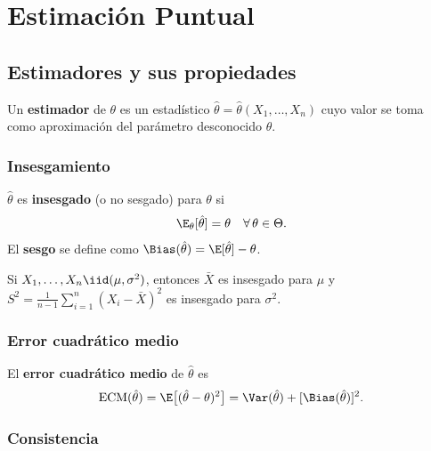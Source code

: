 \section{Estimación Puntual}

\subsection{Estimadores y sus propiedades}

\begin{defi}[Estimador]
  Un \textbf{estimador} de $\theta$ es un estadístico $\hat{\theta} =
  \hat{\theta}(X_1,\ldots,X_n)$ cuyo valor se toma como aproximación del
  parámetro desconocido $\theta$.
\end{defi}

\subsubsection{Insesgamiento}

\begin{defi}
  $\hat{\theta}$ es \textbf{insesgado} (o no sesgado) para $\theta$ si
  \[
    \E_\theta[\hat{\theta}] = \theta \quad \forall\, \theta \in \Theta.
  \]
  El \textbf{sesgo} se define como $\Bias(\hat{\theta}) = \E[\hat{\theta}] - \theta$.
\end{defi}

\begin{ejemplo}
  Si $X_1,\ldots,X_n \iid (\mu, \sigma^2)$, entonces $\bar{X}$ es insesgado
  para $\mu$ y $S^2 = \tfrac{1}{n-1}\sum_{i=1}^n (X_i - \bar{X})^2$ es
  insesgado para $\sigma^2$.
\end{ejemplo}

\subsubsection{Error cuadrático medio}

\begin{defi}[ECM]
  El \textbf{error cuadrático medio} de $\hat{\theta}$ es
  \[
    \mathrm{ECM}(\hat{\theta}) = \E\bigl[(\hat{\theta} - \theta)^2\bigr]
    = \Var(\hat{\theta}) + [\Bias(\hat{\theta})]^2.
  \]
\end{defi}

\subsubsection{Consistencia}

